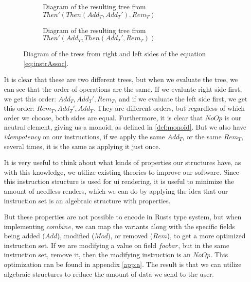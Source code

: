 \begin{figure}[H]
  \begin{subfigure}[h]{0.49\linewidth}
    \centering
    
    \caption{
      Diagram of the resulting tree from $Then'(Then(Add_T, Add_T'), Rem_T)$
    }
    \label{sfig:instrTree1}
  \end{subfigure}
  \hfill
  \begin{subfigure}[h]{0.49\linewidth}
    \centering
    
    \caption{
      Diagram of the resulting tree from $Then'(Add_T, Then(Add_T', Rem_T))$
    }
    \label{sfig:instrTree2}
  \end{subfigure}
  \caption{
    Diagram of the tress from right and left sides of the equation
    \ref{eq:instrAssoc}.
  }
  \label{fig:instrTree}
\end{figure}

It is clear that these are two different trees, but when we evaluate the tree,
we can see that the order of operations are the same. If we evaluate right side
first, we get this order: $Add_T, Add_T', Rem_T$, and if we evaluate the left
side first, we get this order: $Rem_T, Add_T', Add_T$. They are different
orders, but regardless of which order we choose, both sides are equal.
Furthermore, it is clear that $NoOp$ is our neutral element, giving us a monoid,
as defined in \ref{def:monoid}. But we also have \textit{idempotency} on our
instructions, if we apply the same $Add_T$, or the same $Rem_T$, several times,
it is the same as applying it just once.

It is very useful to think about what kinds of properties our structures have,
as with this knowledge, we utilize existing theories to improve our software.
Since this instruction structure is used for \gls*{ui} rendering, it is useful
to minimize the amount of needless renders, which we can do by applying the idea
that our instruction set is an algebraic structure with properties.

But these properties are not possible to encode in Rusts type system, but when
implementing $combine$, we can map the variants along with the specific fields
being added ($Add$), modified ($Mod$), or removed ($Rem$), to get a more
optimized instruction set. If we are modifying a value on field $foobar$, but in
the same instruction set, remove it, then the modifying instruction is an
$NoOp$. This optimization can be found in appendix \ref{app:a}. The result is
that we can utilize algebraic structures to reduce the amount of data we send
to the user.


